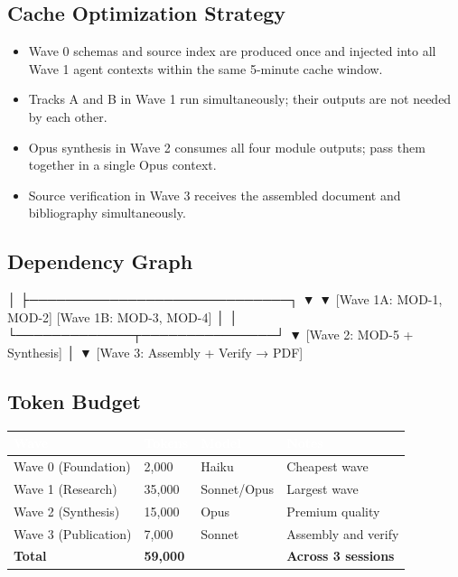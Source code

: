 \documentclass[11pt,letterpaper]{article}
\newcommand{\tableheader}[1]{\textbf{\sffamily\textcolor{white}{#1}}}
\begin{document}
\subsection{Cache Optimization Strategy}

\begin{itemize}
  \item Wave 0 schemas and source index are produced once and injected into all Wave 1 agent contexts within the same 5-minute cache window.
  \item Tracks A and B in Wave 1 run simultaneously; their outputs are not needed by each other.
  \item Opus synthesis in Wave 2 consumes all four module outputs; pass them together in a single Opus context.
  \item Source verification in Wave 3 receives the assembled document and bibliography simultaneously.
\end{itemize}

\subsection{Dependency Graph}

\begin{asciibox}
         │
         ├─────────────────────────────┐
         ▼                             ▼
[Wave 1A: MOD-1, MOD-2]     [Wave 1B: MOD-3, MOD-4]
         │                             │
         └─────────────┬───────────────┘
                       ▼
            [Wave 2: MOD-5 + Synthesis]
                       │
                       ▼
              [Wave 3: Assembly + Verify → PDF]
\end{asciibox}

\subsection{Token Budget}

\begin{center}
\begin{tabularx}{\textwidth}{L{4cm}C{2cm}C{2cm}X}
\toprule
{}
\tableheader{Wave} & \tableheader{Tokens} & \tableheader{Model} & \tableheader{Notes} \\
\midrule
Wave 0 (Foundation) & 2,000 & Haiku & Cheapest wave \\
Wave 1 (Research) & 35,000 & Sonnet/Opus & Largest wave \\
Wave 2 (Synthesis) & 15,000 & Opus & Premium quality \\
Wave 3 (Publication) & 7,000 & Sonnet & Assembly and verify \\
\midrule
\textbf{Total} & \textbf{59,000} & & \textbf{Across 3 sessions} \\
\bottomrule
\end{tabularx}
\end{center}
\end{document}

